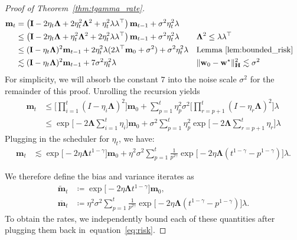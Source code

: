 \documentclass{article}
\def\w{{\mathbf{w}}}
\def\m{{\mathbf{m}}}
\def\H{{\mathbf{H}}}
\def\H{{\mathbf{H}}}
\def\I{{\mathbf{I}}}
\def\bm{\widetilde{\m}}
\def\vm{\overline{\m}}
\def\LLambda{{\mathbf{\Lambda}}}
\def\eqref#1{equation~\ref{#1}}
\def\vm{{\bm{m}}}
\def\w{{\mathbf{w}}}
\def\m{{\mathbf{m}}}
\def\H{{\mathbf{H}}}
\def\H{{\mathbf{H}}}
\def\bm{\widetilde{\m}}
\def\vm{\overline{\m}}
\def\LLambda{{\mathbf{\Lambda}}}
\def\I{\mathbf{I}}
\theoremstyle{plain}
\def\w{{\mathbf{w}}}
\def\m{{\mathbf{m}}}
\def\H{{\mathbf{H}}}
\def\I{{\mathbf{I}}}
\def\bm{\widetilde{\m}}
\def\vm{\overline{\m}}
\def\LLambda{{\mathbf{\Lambda}}}
\begin{document}
\begin{proof}[Proof of Theorem~\ref{thm:tgamma_rate}]
\begin{align*}
    \m_t
    &=
    \left(
        \I
        - 2\eta_t\LLambda
        + 2\eta_t^2\LLambda^2
        + \eta_t^2\lambda\lambda^\top
    \right)\m_{t-1}
    + \sigma^2\eta_t^2\lambda \\
    &\leq \left(
        \I
        - 2\eta_t\LLambda
        + \eta_t^2\LLambda^2
        + 2\eta_t^2\lambda\lambda^\top
    \right)\m_{t-1}
    + \sigma^2\eta_t^2\lambda && \LLambda^2 \leq \lambda \lambda^\top \\
    &\leq
    (\I-\eta_t\LLambda)^2\m_{t-1}
    + 2\eta_t^2 \lambda (2 \lambda^\top \m_0 + \sigma^2) + \sigma^2\eta_t^2\lambda
    && \text{Lemma~\ref{lem:bounded_risk}} \\
    &\lesssim (\I-\eta_t\LLambda)^2\m_{t-1} + 
    7 \sigma^2\eta_t^2\lambda && \|\w_0 - \w^\star\|_\H^2 \lesssim \sigma^2
\end{align*}
For simplicity, we will absorb the constant $7$ into the noise scale $\sigma^2$ for the remainder of this proof. Unrolling the recursion yields
\begin{align}
    \m_t
    &\leq
    \Bigg[\prod_{i=1}^t (I-\eta_i \LLambda)^2\Bigg]\m_0
    + \sum_{p=1}^t \eta_p^2\sigma^2
    \Bigg[\prod_{r=p+1}^t (I-\eta_r \LLambda)^2\Bigg]\lambda \\
    &\le
    \exp\Big[-2\LLambda \sum_{i=1}^t \eta_i\Big]\m_0
    + \sigma^2 \sum_{p=1}^t \eta_p^2
    \exp\Big[-2\LLambda \sum_{r=p+1}^t \eta_r\Big]\lambda
    \label{eq:bias_and_variance_eta}
\end{align}
Plugging in the scheduler for $\eta_t$, we have:
\begin{align*}
    \m_t
    &\lesssim
    \exp\big[-2\eta \LLambda t^{1-\gamma}\big]\m_0
    + \eta^2\sigma^2 \sum_{p=1}^t \frac{1}{p^{2\gamma}}
    \exp\Big[-2\eta\LLambda (t^{1-\gamma}-p^{1-\gamma})\Big]\lambda .
\end{align*}

We therefore define the bias and variance iterates as
\begin{align}
    \bm_t
    &\coloneqq
    \exp\big[-2\eta \LLambda t^{1-\gamma}\big]\m_0, \\
    \vm_t
    &\coloneqq
    \eta^2\sigma^2 \sum_{p=1}^t \frac{1}{p^{2\gamma}}
    \exp\Big[-2\eta\LLambda (t^{1-\gamma}-p^{1-\gamma})\Big]\lambda .
\end{align}
To obtain the rates, we independently bound each of these quantities after plugging them back in~\eqref{eq:risk}. 

\end{proof}
\end{document}
